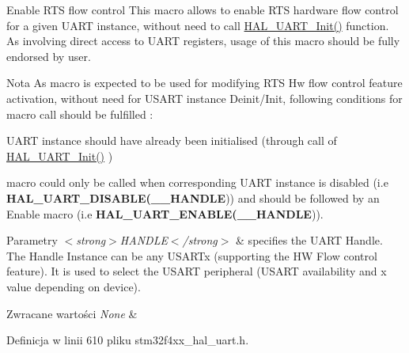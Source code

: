 Enable R\+TS flow control This macro allows to enable R\+TS hardware flow control for a given U\+A\+RT instance, without need to call \hyperlink{group___u_a_r_t___exported___functions___group1_gabe47045024787099b0bfa82bbe7b0b6a}{H\+A\+L\+\_\+\+U\+A\+R\+T\+\_\+\+Init()} function. As involving direct access to U\+A\+RT registers, usage of this macro should be fully endorsed by user. 

\begin{DoxyNote}{Nota}
As macro is expected to be used for modifying R\+TS Hw flow control feature activation, without need for U\+S\+A\+RT instance Deinit/\+Init, following conditions for macro call should be fulfilled \+:
\begin{DoxyItemize}
\item U\+A\+RT instance should have already been initialised (through call of \hyperlink{group___u_a_r_t___exported___functions___group1_gabe47045024787099b0bfa82bbe7b0b6a}{H\+A\+L\+\_\+\+U\+A\+R\+T\+\_\+\+Init()} )
\item macro could only be called when corresponding U\+A\+RT instance is disabled (i.\+e {\bfseries H\+A\+L\+\_\+\+U\+A\+R\+T\+\_\+\+D\+I\+S\+A\+B\+LE(\+\_\+\+\_\+\+H\+A\+N\+D\+LE})) and should be followed by an Enable macro (i.\+e {\bfseries H\+A\+L\+\_\+\+U\+A\+R\+T\+\_\+\+E\+N\+A\+B\+LE(\+\_\+\+\_\+\+H\+A\+N\+D\+LE})). 
\end{DoxyItemize}
\end{DoxyNote}

\begin{DoxyParams}{Parametry}
{\em $<$strong$>$\+H\+A\+N\+D\+L\+E$<$/strong$>$} & specifies the U\+A\+RT Handle. The Handle Instance can be any U\+S\+A\+R\+Tx (supporting the HW Flow control feature). It is used to select the U\+S\+A\+RT peripheral (U\+S\+A\+RT availability and x value depending on device). \\
\hline
\end{DoxyParams}

\begin{DoxyRetVals}{Zwracane wartości}
{\em None} & \\
\hline
\end{DoxyRetVals}


Definicja w linii 610 pliku stm32f4xx\+\_\+hal\+\_\+uart.\+h.

\mbox{\label{group___u_a_r_t___exported___macros_ga2dbd7e6592e8c5999f817b69f0fd24bb}} 
